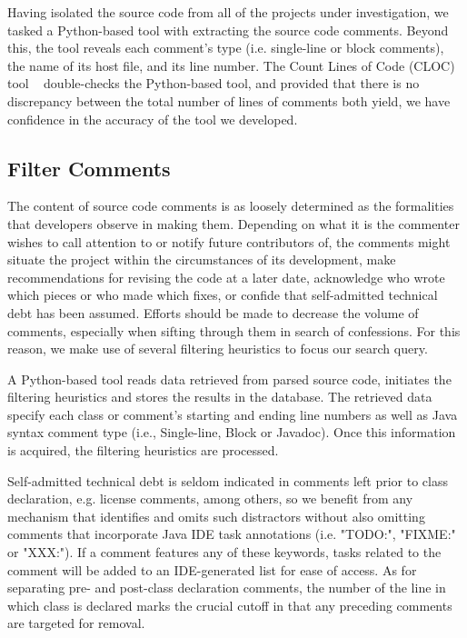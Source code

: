 Having isolated the source code from all of the projects under investigation, we tasked a Python-based tool with extracting the source code comments. Beyond this, the tool reveals each comment's type (i.e. single-line or block comments), the name of its host file, and its line number. The Count Lines of Code (CLOC) tool ~\cite{cloc} double-checks the Python-based tool, and provided that there is no discrepancy between the total number of lines of comments both yield, we have confidence in the accuracy of the tool we developed.

\subsection{Filter Comments}


The content of source code comments is as loosely determined as the formalities that developers observe in making them. Depending on what it is the commenter wishes to call attention to or notify future contributors of, the comments might situate the project within the circumstances of its development, make recommendations for revising the code at a later date, acknowledge who wrote which pieces or who made which fixes, or confide that self-admitted technical debt has been assumed. Efforts should be made to decrease the volume of comments, especially when sifting through them in search of \SATD confessions. For this reason, we make use of several filtering heuristics to focus our search query.\par

A Python-based tool reads data retrieved from parsed source code, initiates the filtering heuristics and stores the results in the database. The retrieved data specify each class or comment's starting and ending line numbers as well as Java syntax comment type (i.e., Single-line, Block or Javadoc). Once this information is acquired, the filtering heuristics are processed. \par

Self-admitted technical debt is seldom indicated in comments left prior to class declaration, e.g. license comments, among others, so we benefit from any mechanism that identifies and omits such distractors without also omitting comments that incorporate Java IDE task annotations (i.e. "TODO:", "FIXME:" or "XXX:"). If a comment features any of these keywords, tasks related to the comment will be added to an IDE-generated list for ease of access. As for separating pre- and post-class declaration comments, the number of the line in which class is declared marks the crucial cutoff in that any preceding comments are targeted for removal.\par

